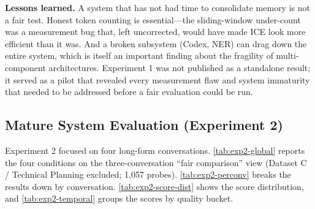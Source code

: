 \documentclass[10pt]{article}
\begin{document}
\textbf{Lessons learned.} A system that has not had time to consolidate memory is not a fair test. Honest token counting is essential---the sliding-window under-count was a measurement bug that, left uncorrected, would have made ICE look more efficient than it was. And a broken subsystem (Codex, NER) can drag down the entire system, which is itself an important finding about the fragility of multi-component architectures. Experiment 1 was not published as a standalone result; it served as a pilot that revealed every measurement flaw and system immaturity that needed to be addressed before a fair evaluation could be run.

\subsection{Mature System Evaluation (Experiment 2)}
\label{sec:exp2}

Experiment 2 focused on four long-form conversations. \cref{tab:exp2-global} reports the four conditions on the three-conversation ``fair comparison'' view (Dataset C / Technical Planning excluded; 1{,}057 probes). \cref{tab:exp2-perconv} breaks the results down by conversation. \cref{tab:exp2-score-dist} shows the score distribution, and \cref{tab:exp2-temporal} groups the scores by quality bucket.

\begin{table}[htbp]
\centering
\small
\caption{Experiment 2 (Mature System) --- Global comparison, ICE-Dev excluded (1,057 probes across 3 conversations). On the three conversations where both systems could actually generate usable answers, ICE essentially ties the vector baseline on mean score (4.26 vs 4.25), injects 32\% fewer fragments, and wins 30.6\% of head-to-head comparisons (vs 21.2\%).}
\label{tab:exp2-global}
\end{table}
\end{document}
